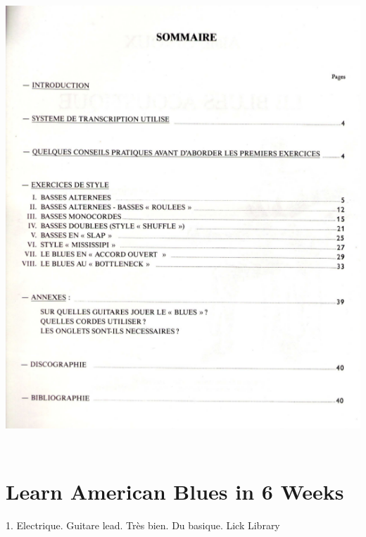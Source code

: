 \documentclass[a4paper]{book}
\begin{document}
\clearpage

\begin{center}
\includegraphics[width=14.469cm,height=17.247cm]{lebluessupportsmethodes-img116.png}
\end{center}





\clearpage


\section[Learn American Blues in 6 Weeks]{Learn American Blues in 6
Weeks}
\hypertarget{RefHeadingToc172973218262}{}1. Electrique. Guitare lead.
Tr\`es bien. Du basique. Lick Library
\end{document}
